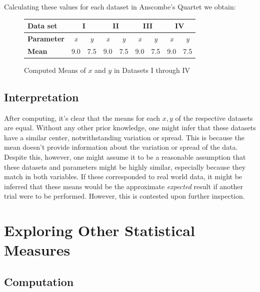 \documentclass[11pt,a4paper]{article}
\begin{document}
Calculating these values for each dataset in Anscombe's Quartet we obtain:

\begin{figure}[ht]
\centering
\begin{tabular}{|l|cc|cc|cc|cc|}
\hline
\textbf{Data set}         & \multicolumn{2}{c|}{\textbf{I}}              & \multicolumn{2}{c|}{\textbf{II}}             & \multicolumn{2}{c|}{\textbf{III}}            & \multicolumn{2}{c|}{\textbf{IV}}             \\ \hline
\textbf{Parameter} & \multicolumn{1}{c|}{\textit{x}} & \textit{y} & \multicolumn{1}{c|}{\textit{x}} & \textit{y} & \multicolumn{1}{c|}{\textit{x}} & \textit{y} & \multicolumn{1}{c|}{\textit{x}} & \textit{y} \\ \hline
\textbf{Mean}     & \multicolumn{1}{c|}{9.0}        & 7.5        & \multicolumn{1}{c|}{9.0}        & 7.5        & \multicolumn{1}{c|}{9.0}        & 7.5        & \multicolumn{1}{c|}{9.0}        & 7.5        \\ \hline
\end{tabular}
\caption{Computed Means of $x$ and $y$ in Datasets I through IV}
\end{figure}

\subsection{Interpretation}

After computing, it's clear that the means for each $x, y$ of the respective datasets are equal. Without any other prior knowledge, one might infer that these datasets have a similar center, notwithstanding variation or spread. This is because the mean doesn't provide information about the variation or spread of the data. Despite this, however, one might assume it to be a reasonable assumption that these datasets and parameters might be highly similar, especially because they match in both variables. If these corresponded to real world data, it might be inferred that these means would be the approximate \textit{expected} result if another trial were to be performed. However, this is contested upon further inspection.

\section{Exploring Other Statistical Measures}
\subsection{Computation}
\end{document}
